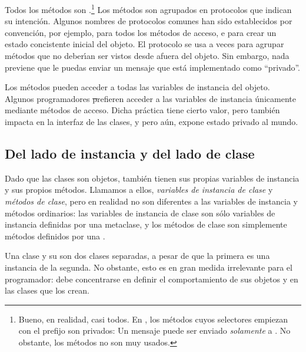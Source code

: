 \documentclass[a4paper,10pt,twoside]{book}
\begin{document}
Todos los m\'etodos  son .\footnote{Bueno, en realidad, casi todos. En \pharo, los m\'etodos cuyos selectores empiezan con el prefijo  son privados: Un mensaje  puede ser enviado  \emph{solamente} a \self. No obstante, los m\'etodos  no son muy usados.}
Los m\'etodos son agrupados en protocolos que indican su intenci\'on. 
Algunos nombres de protocolos comunes han sido establecidos por convenci\'on, por ejemplo,  para todos los m\'etodos de acceso, e  para crear un estado concistente inicial del objeto. El protocolo  se usa a veces para agrupar m\'etodos que no deber\'\i{}an ser vistos desde afuera del objeto. Sin embargo, nada previene que le puedas enviar un mensaje que est\'a implementado como ``privado''.  

Los m\'etodos pueden acceder a todas las variables de instancia del objeto.
Algunos programadores \st prefieren acceder a las variables de instancia \'unicamente mediante m\'etodos de acceso. 
Dicha pr\'actica tiene cierto valor, pero tambi\'en impacta en la interfaz de las clases, y pero a\'un, expone estado privado al mundo.

\subsection{Del lado de instancia y del lado de clase}

Dado que las clases son objetos, tambi\'en tienen sus propias variables de instancia y sus propios m\'etodos.
Llamamos a ellos, \emph{variables de instancia de clase} y \emph{m\'etodos de clase}, pero en realidad no son diferentes a las variables de instancia y m\'etodos ordinarios:
las variables de instancia de clase son s\'olo variables de instancia definidas por una metaclase, y los m\'etodos de clase son simplemente m\'etodos definidos por una  . 


Una clase y su  son dos clases separadas, a pesar de que la primera es una instancia de la segunda. No obstante, esto es en gran medida irrelevante para el programador:  debe concentrarse en definir el comportamiento de sus objetos y en las clases que los crean. 
\end{document}
